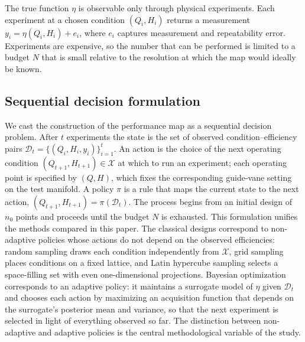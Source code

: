 \documentclass[preprint,12pt]{elsarticle}
\begin{document}
The true function $\eta$ is observable only through physical experiments. Each
experiment at a chosen condition $(Q_i, H_i)$ returns a measurement
$y_i = \eta(Q_i, H_i) + e_i$, where $e_i$ captures measurement and repeatability
error. Experiments are expensive, so the number that can be performed is limited to a
budget $N$ that is small relative to the resolution at which the map would ideally be
known.

\subsection{Sequential decision formulation}
We cast the construction of the performance map as a sequential decision problem.
After $t$ experiments the state is the set of observed condition--efficiency pairs
$\mathcal{D}_t = \{(Q_i, H_i, y_i)\}_{i=1}^{t}$. An action is the choice of the next
operating condition $(Q_{t+1}, H_{t+1}) \in \mathcal{X}$ at which to run an
experiment; each operating point is specified by $(Q, H)$, which fixes the
corresponding guide-vane setting on the test manifold. A policy $\pi$ is a rule that
maps the current state to the next action, $(Q_{t+1}, H_{t+1}) = \pi(\mathcal{D}_t)$.
The process begins from an initial design of $n_0$ points and proceeds until the
budget $N$ is exhausted. This formulation unifies the methods compared in this paper.
The classical designs correspond to non-adaptive policies whose actions do not depend
on the observed efficiencies: random sampling draws each condition independently from
$\mathcal{X}$, grid sampling places conditions on a fixed lattice, and Latin hypercube
sampling selects a space-filling set with even one-dimensional projections. Bayesian
optimization corresponds to an adaptive policy: it maintains a surrogate model of
$\eta$ given $\mathcal{D}_t$ and chooses each action by maximizing an acquisition
function that depends on the surrogate's posterior mean and variance, so that the next
experiment is selected in light of everything observed so far. The distinction between
non-adaptive and adaptive policies is the central methodological variable of the
study.
\end{document}
